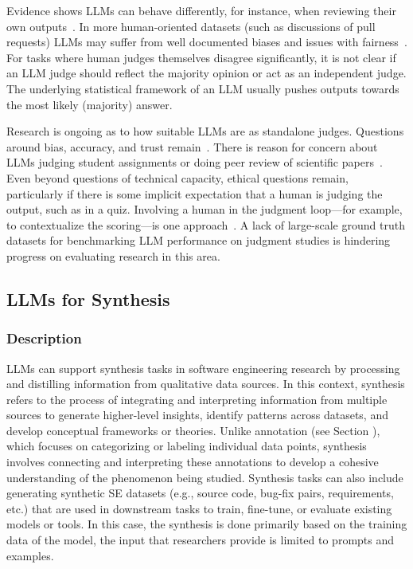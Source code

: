 Evidence shows LLMs can behave differently, for instance, when reviewing their own outputs~\cite{NEURIPS2024_7f1f0218}. In more human-oriented datasets (such as discussions of pull requests) LLMs may suffer from well documented biases and issues with fairness~\cite{Gallegos2024BiasAF}. 
For tasks where human judges themselves disagree significantly, it is not clear if an LLM judge should reflect the majority opinion or act as an independent judge. The underlying statistical framework of an LLM usually pushes outputs towards the most likely (majority) answer. 

Research is ongoing as to how suitable LLMs are as standalone judges. Questions around bias, accuracy, and trust remain~\cite{DBLP:journals/corr/abs-2406-18403}. There is reason for concern about LLMs judging student assignments or doing peer review of scientific papers~\cite{DBLP:conf/coling/ZhouC024}. Even beyond questions of technical capacity, ethical questions remain, particularly if there is some implicit expectation that a human is judging the output, such as in a quiz. Involving a human in the judgment loop---for example, to contextualize the scoring---is one approach~\cite{panHumanCenteredDesignRecommendations2024}. 
A lack of large-scale ground truth datasets for benchmarking LLM performance on judgment studies is hindering progress on evaluating research in this area.


\subsection{LLMs for Synthesis}
\label{sec:llms-for-synthesis}

\subsubsection{Description}

LLMs can support synthesis tasks in software engineering research by processing and distilling information from qualitative data sources.
In this context, synthesis refers to the process of integrating and interpreting information from multiple sources to generate higher-level insights, identify patterns across datasets, and develop conceptual frameworks or theories. Unlike annotation (see Section \annotators), which focuses on categorizing or labeling individual data points, synthesis involves connecting and interpreting these annotations to develop a cohesive understanding of the phenomenon being studied.
Synthesis tasks can also include generating synthetic SE datasets (e.g., source code, bug-fix pairs, requirements, etc.) that are used in downstream tasks to train, fine-tune, or evaluate existing models or tools.
In this case, the synthesis is done primarily based on the training data of the model, the input that researchers provide is limited to prompts and examples.

